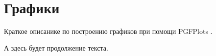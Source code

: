 \chapter{Графики}
\label{ch:plot}

Краткое описанике по построению графиков при помощи PGFPlots \cite{habrpgfplots}.


А здесь будет продолжение текста.
\endinput